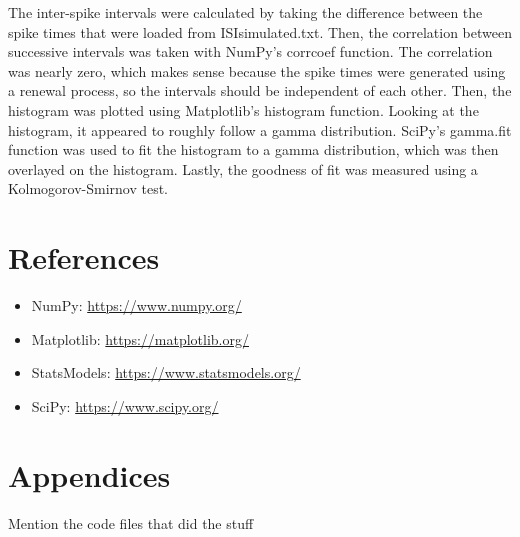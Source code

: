 \documentclass[letterpaper,titlepage,10pt]{article}
\begin{document}
The inter-spike intervals were calculated by taking the difference between the spike times that were loaded from
ISIsimulated.txt. Then, the correlation between successive intervals was taken with NumPy's corrcoef function.
The correlation was nearly zero, which makes sense because the spike times were generated using a renewal process,
so the intervals should be independent of each other. Then, the histogram was plotted using Matplotlib's histogram
function. Looking at the histogram, it appeared to roughly follow a gamma distribution. SciPy's gamma.fit function
was used to fit the histogram to a gamma distribution, which was then overlayed on the histogram. Lastly, the
goodness of fit was measured using a Kolmogorov-Smirnov test.

\section{References}

\begin{itemize}
\item NumPy: \url{https://www.numpy.org/}
\item Matplotlib: \url{https://matplotlib.org/}
\item StatsModels: \url{https://www.statsmodels.org/}
\item SciPy: \url{https://www.scipy.org/}
\end{itemize}

\section{Appendices}
Mention the code files that did the stuff
\end{document}
